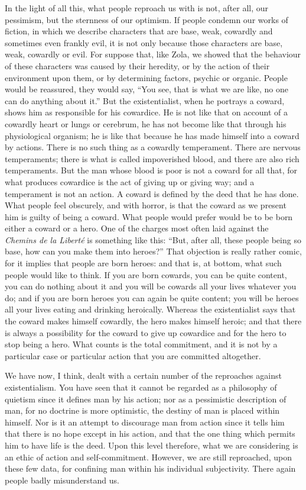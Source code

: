 \documentclass[12pt]{article}
\begin{document}
In the light of all this, what people reproach us with is not, after all, our pessimism, but the sternness of our optimism. If people condemn our works of fiction, in which we describe characters that are base, weak, cowardly and sometimes even frankly evil, it is not only because those characters are base, weak, cowardly or evil. For suppose that, like Zola, we showed that the behaviour of these characters was caused by their heredity, or by the action of their environment upon them, or by determining factors, psychic or organic. People would be reassured, they would say, “You see, that is what we are like, no one can do anything about it.” But the existentialist, when he portrays a coward, shows him as responsible for his cowardice. He is not like that on account of a cowardly heart or lungs or cerebrum, he has not become like that through his physiological organism; he is like that because he has made himself into a coward by actions. There is no such thing as a cowardly temperament. There are nervous temperaments; there is what is called impoverished blood, and there are also rich temperaments. But the man whose blood is poor is not a coward for all that, for what produces cowardice is the act of giving up or giving way; and a temperament is not an action. A coward is defined by the deed that he has done. What people feel obscurely, and with horror, is that the coward as we present him is guilty of being a coward. What people would prefer would be to be born either a coward or a hero. One of the charges most often laid against the \textit{Chemins de la Liberté} is something like this: “But, after all, these people being so base, how can you make them into heroes?” That objection is really rather comic, for it implies that people are born heroes: and that is, at bottom, what such people would like to think. If you are born cowards, you can be quite content, you can do nothing about it and you will be cowards all your lives whatever you do; and if you are born heroes you can again be quite content; you will be heroes all your lives eating and drinking heroically. Whereas the existentialist says that the coward makes himself cowardly, the hero makes himself heroic; and that there is always a possibility for the coward to give up cowardice and for the hero to stop being a hero. What counts is the total commitment, and it is not by a particular case or particular action that you are committed altogether.

We have now, I think, dealt with a certain number of the reproaches against existentialism. You have seen that it cannot be regarded as a philosophy of quietism since it defines man by his action; nor as a pessimistic description of man, for no doctrine is more optimistic, the destiny of man is placed within himself. Nor is it an attempt to discourage man from action since it tells him that there is no hope except in his action, and that the one thing which permits him to have life is the deed. Upon this level therefore, what we are considering is an ethic of action and self-commitment. However, we are still reproached, upon these few data, for confining man within his individual subjectivity. There again people badly misunderstand us.
\end{document}
